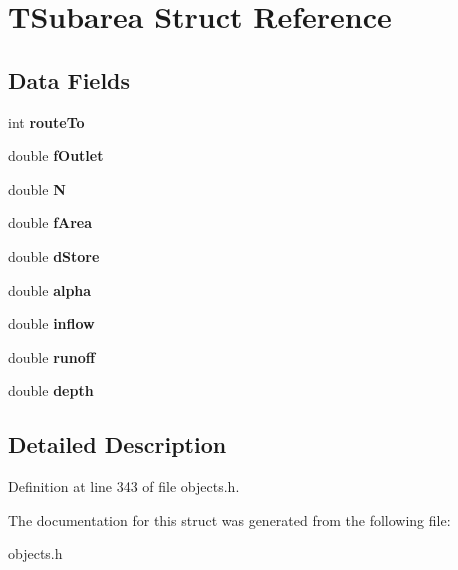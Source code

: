 \hypertarget{struct_t_subarea}{}\section{T\+Subarea Struct Reference}
\label{struct_t_subarea}
\subsection*{Data Fields}
\begin{DoxyCompactItemize}
\item 
\mbox{\label{struct_t_subarea_a4e8ddebcf941fea3602d15e052e844bf}} 
int {\bfseries route\+To}
\item 
\mbox{\label{struct_t_subarea_abf37e6a71ce8a0f9914c4bba2e7393a1}} 
double {\bfseries f\+Outlet}
\item 
\mbox{\label{struct_t_subarea_aed54e3f02ef7426fd92cd6e7e1cd181c}} 
double {\bfseries N}
\item 
\mbox{\label{struct_t_subarea_ad1cb09a46d735423c8e808e24a268311}} 
double {\bfseries f\+Area}
\item 
\mbox{\label{struct_t_subarea_a30f9aa645bd99ca5e4a36f096326ebf5}} 
double {\bfseries d\+Store}
\item 
\mbox{\label{struct_t_subarea_a20f4c4490bc8ecbdd1ffcb79acce6035}} 
double {\bfseries alpha}
\item 
\mbox{\label{struct_t_subarea_a1d63a7ad270bb2f91fd16ce60191dfa6}} 
double {\bfseries inflow}
\item 
\mbox{\label{struct_t_subarea_a365dc60f2331a4280fc2be55b822191c}} 
double {\bfseries runoff}
\item 
\mbox{\label{struct_t_subarea_a6153a438c3d8d1be934e19e97e58c60c}} 
double {\bfseries depth}
\end{DoxyCompactItemize}


\subsection{Detailed Description}


Definition at line 343 of file objects.\+h.



The documentation for this struct was generated from the following file\+:\begin{DoxyCompactItemize}
\item 
objects.\+h\end{DoxyCompactItemize}

